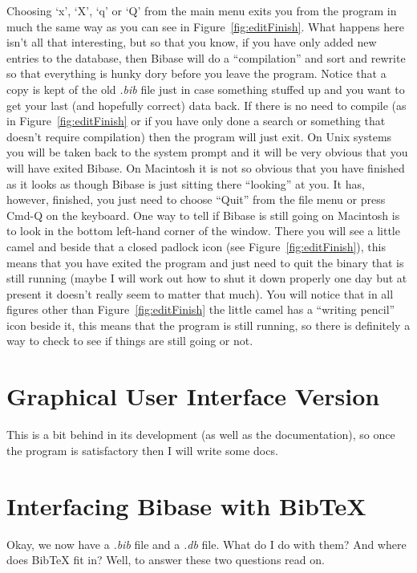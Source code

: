 \documentclass[12pt,a4paper]{book}
\newcommand {\fig}[1] {Figure~\ref{#1}}
\begin{document}
Choosing `x', `X', `q' or `Q' from the main menu exits you from the 
program in much the same way as you can see in \fig{fig:editFinish}.  
What happens here isn't all that interesting, but so that you know, if 
you have only added new entries to the database, then Bibase will do a 
``compilation'' and sort and rewrite so that everything is hunky dory 
before you leave the program.  Notice that a copy is kept of the old 
\emph{.bib} file just in case 
something stuffed up and you want to get your last (and hopefully 
correct) data back.
If there is no need to compile (as in 
\fig{fig:editFinish} or if you have only done a search or something 
that doesn't require compilation) then the program will just exit.  On 
Unix systems you will be taken back to the system prompt and it will 
be very obvious that you will have exited Bibase.  On Macintosh it is 
not so obvious that you have finished as it looks as though Bibase is 
just sitting there ``looking'' at you.  It has, however, finished, you 
just need to choose ``Quit'' from the file menu or press Cmd-Q on the 
keyboard.  One way to tell if Bibase is still going on Macintosh is to 
look in the bottom left-hand corner of the window.  There you will 
see a little camel and beside that a closed padlock icon (see 
\fig{fig:editFinish}), this means 
that you have exited the program and just need to quit the binary 
that is still running (maybe I will work out how to shut it down 
properly one day but at present it doesn't really seem to matter that 
much).  You will notice that in all figures other than 
\fig{fig:editFinish} the little camel has a ``writing pencil'' icon 
beside it, this means that the program is still running, so there is 
definitely a way to check to see if things are still going or not.

\chapter{Graphical User Interface Version}

This is a bit behind in its development (as well as the 
documentation), so once the program is satisfactory then I will write 
some docs.

\chapter{Interfacing Bibase with BibTeX}

Okay, we now have a \emph{.bib} file and a \emph{.db} file.  What do I 
do with them?  And where does BibTeX fit in?  Well, to answer these 
two questions read on.  
\end{document}
